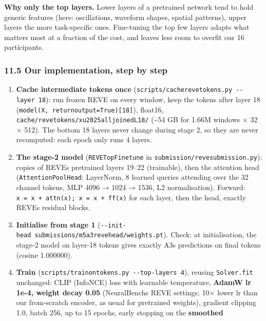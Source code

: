 \documentclass[
  11pt,
]{article}
\providecommand{\tightlist}{%
  \setlength{\itemsep}{0pt}\setlength{\parskip}{0pt}}
\renewcommand{\_}{\oldunderscore\allowbreak}
\begin{document}
\textbf{Why only the top layers.} Lower
layers of a pretrained network tend to
hold generic features (here:
oscillations, waveform shapes, spatial
patterns), upper layers the more
task-specific ones. Fine-tuning the top
few layers adapts what matters most at a
fraction of the cost, and leaves less
room to overfit our 16 participants.

\subsubsection{11.5 Our implementation,
step by
step}\label{our-implementation-step-by-step}

\begin{enumerate}
\def\labelenumi{\arabic{enumi}.}
\tightlist
\item
  \textbf{Cache intermediate tokens
  once}
  (\texttt{scripts/cache\_reve\_tokens.py\ -\/-layer\ 18}):
  run frozen REVE on every window, keep
  the tokens after layer 18
  (\texttt{model(X,\ return\_output=True){[}18{]}}),
  float16,
  \texttt{cache/reve\_tokens/xu2025alljoined\_L18/}
  (\textasciitilde54 GB for 1.66M
  windows × 32 × 512). The bottom 18
  layers never change during stage 2, so
  they are never recomputed: each epoch
  only runs 4 layers.
\item
  \textbf{The stage-2 model}
  (\texttt{REVETopFinetune} in
  \texttt{submission/reve\_submission.py}):
  copies of REVE\textquotesingle s
  pretrained layers 19--22 (trainable),
  then the attention head
  (\texttt{AttentionPoolHead}:
  LayerNorm, 8 learned queries attending
  over the 32 channel tokens, MLP 4096 →
  1024 → 1536, L2 normalisation).
  Forward:
  \texttt{x\ =\ x\ +\ attn(x);\ x\ =\ x\ +\ ff(x)}
  for each layer, then the head, exactly
  REVE\textquotesingle s residual
  blocks.
\item
  \textbf{Initialise from stage 1}
  (\texttt{-\/-init-head\ submissions/m5\_a3\_reve\_head/weights.pt}).
  Check: at initialisation, the stage-2
  model on layer-18 tokens gives exactly
  A3\textquotesingle s predictions on
  final tokens (cosine 1.000000).
\item
  \textbf{Train}
  (\texttt{scripts/train\_on\_tokens.py\ -\/-top-layers\ 4}),
  reusing \texttt{Solver.fit} unchanged:
  CLIP (InfoNCE) loss with learnable
  temperature, \textbf{AdamW lr 1e-4,
  weight decay 0.05}
  (NeuralBench\textquotesingle s REVE
  settings; 10× lower lr than our
  from-scratch encoder, as usual for
  pretrained weights), gradient clipping
  1.0, batch 256, up to 15 epochs, early
  stopping on the \textbf{smoothed}

\end{enumerate}
\end{document}

